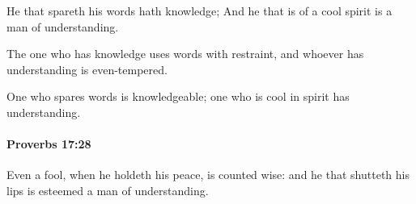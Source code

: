 			\begin{versebox}
					\item[BHS] 
					\item[ASV] He that spareth his words hath knowledge; And he that is of a cool spirit is a man of understanding.
					\item[NIV] The one who has knowledge uses words with restraint, and whoever has understanding is even-tempered.
					\item[NRSV] One who spares words is knowledgeable; one who is cool in spirit has understanding.
			\end{versebox}

		\paragraph{Proverbs 17:28} %
			\label{PROVERBS-17-28}

			Even a fool, when he holdeth his peace, is counted wise: and he that shutteth his lips is esteemed a man of understanding.

